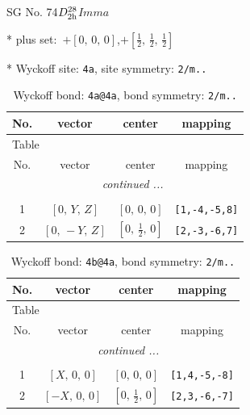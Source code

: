 \documentclass[fleqn,8pt]{jsarticle}
\begin{document}
\setcounter{MaxMatrixCols}{32}

\renewcommand{\tablename}{Table~}
\renewcommand{\figurename}{Figure~}
\begin{center}
\LARGE
SG No. 74\quad$D_{\rm 2h}^{28}$\quad$Imma$\quad[ orthorhombic ]
\end{center}

* plus set:\,\,\,$+\left[ 0,\, 0,\, 0 \right]$,\quad $+\left[ \frac{1}{2},\, \frac{1}{2},\, \frac{1}{2} \right]$


* Wyckoff site: {\tt 4a}, site symmetry: {\tt 2/m..}
\renewcommand{\arraystretch}{1.2}
\begin{longtable}{cccc}
\caption{Wyckoff bond: {\tt 4a@4a}, bond symmetry: {\tt 2/m..}}
 \\
 \hline \hline
No. & vector & center & mapping \\ \hline \endfirsthead

\multicolumn{3}{l}{\tablename\ \thetable{}} \\
 \hline \hline
No. & vector & center & mapping \\ \hline \endhead

 \hline \hline
\multicolumn{3}{r}{\footnotesize\it continued ...} \\ \endfoot

 \hline \hline
\multicolumn{3}{r}{} \\ \endlastfoot

1 & $\left[ 0,\, Y,\, Z \right]$ & $\left[ 0,\, 0,\, 0 \right]$ & {\tt [1,-4,-5,8]} \\ \hline
2 & $\left[ 0,\, - Y,\, Z \right]$ & $\left[ 0,\, \frac{1}{2},\, 0 \right]$ & {\tt [2,-3,-6,7]} \\
\end{longtable}
\renewcommand{\arraystretch}{1.2}
\begin{longtable}{cccc}
\caption{Wyckoff bond: {\tt 4b@4a}, bond symmetry: {\tt 2/m..}}
 \\
 \hline \hline
No. & vector & center & mapping \\ \hline \endfirsthead

\multicolumn{3}{l}{\tablename\ \thetable{}} \\
 \hline \hline
No. & vector & center & mapping \\ \hline \endhead

 \hline \hline
\multicolumn{3}{r}{\footnotesize\it continued ...} \\ \endfoot

 \hline \hline
\multicolumn{3}{r}{} \\ \endlastfoot

1 & $\left[ X,\, 0,\, 0 \right]$ & $\left[ 0,\, 0,\, 0 \right]$ & {\tt [1,4,-5,-8]} \\ \hline
2 & $\left[ - X,\, 0,\, 0 \right]$ & $\left[ 0,\, \frac{1}{2},\, 0 \right]$ & {\tt [2,3,-6,-7]} \\
\end{longtable}
\end{document}
